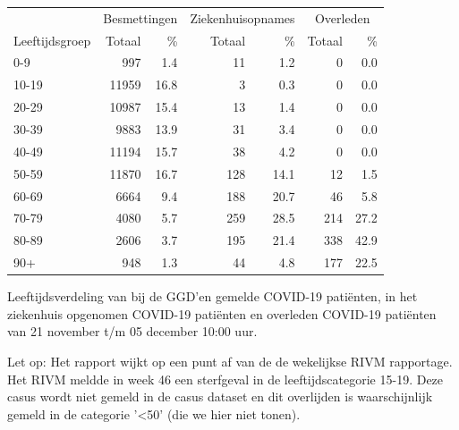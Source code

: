 \documentclass[
  english,
  man,floatsintext]{apa6}
\begin{document}
\begin{table}[H]
\centering\begingroup\fontsize{11}{13}\selectfont

\begin{threeparttable}
\begin{tabular}{lrrrrrr}
\toprule
\multicolumn{1}{c}{ } & \multicolumn{2}{c}{Besmettingen} & \multicolumn{2}{c}{Ziekenhuisopnames} & \multicolumn{2}{c}{Overleden} \\
\cmidrule(l{3pt}r{3pt}){2-3} \cmidrule(l{3pt}r{3pt}){4-5} \cmidrule(l{3pt}r{3pt}){6-7}
Leeftijdsgroep & Totaal & \% & Totaal & \% & Totaal & \%\\
\midrule
0-9 & 997 & 1.4 & 11 & 1.2 & 0 & 0.0\\
10-19 & 11959 & 16.8 & 3 & 0.3 & 0 & 0.0\\
20-29 & 10987 & 15.4 & 13 & 1.4 & 0 & 0.0\\
30-39 & 9883 & 13.9 & 31 & 3.4 & 0 & 0.0\\
40-49 & 11194 & 15.7 & 38 & 4.2 & 0 & 0.0\\
50-59 & 11870 & 16.7 & 128 & 14.1 & 12 & 1.5\\
60-69 & 6664 & 9.4 & 188 & 20.7 & 46 & 5.8\\
70-79 & 4080 & 5.7 & 259 & 28.5 & 214 & 27.2\\
80-89 & 2606 & 3.7 & 195 & 21.4 & 338 & 42.9\\
90+ & 948 & 1.3 & 44 & 4.8 & 177 & 22.5\\
\bottomrule
\end{tabular}
\begin{tablenotes}
\item[1] Leeftijdsverdeling van bij de GGD’en gemelde COVID-19 patiënten, in het ziekenhuis opgenomen COVID-19 patiënten en overleden COVID-19 patiënten van 21 november t/m 05 december 10:00 uur.
\item[2] Let op: Het rapport wijkt op een punt af van de de wekelijkse RIVM rapportage. Het RIVM meldde in week 46 een sterfgeval in de leeftijdscategorie 15-19. Deze casus wordt niet gemeld in de casus dataset en dit overlijden is waarschijnlijk gemeld in de categorie '<50' (die we hier niet tonen).
\end{tablenotes}
\end{threeparttable}
\endgroup{}
\end{table}

\newpage
\end{document}
